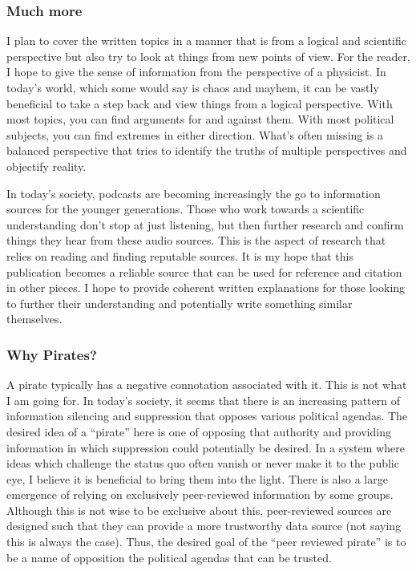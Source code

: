 \documentclass[10pt, a4paper, twocolumn]{book}
\begin{document}
\subsubsection*{Much more}

I plan to cover the written topics in a manner that is from a logical and scientific perspective but also try to look at things from new points of view. For the reader, I hope to give the sense of information from the perspective of a physicist. In today's world, which some would say is chaos and mayhem, it can be vastly beneficial to take a step back and view things from a logical perspective. With most topics, you can find arguments for and against them. With most political subjects, you can find extremes in either direction. What's often missing is a balanced perspective that tries to identify the truths of multiple perspectives and objectify reality. 

In today's society, podcasts are becoming increasingly the go to information sources for the younger generations. Those who work towards a scientific understanding don't stop at just listening, but then further research and confirm things they hear from these audio sources. This is the aspect of research that relies on reading and finding reputable sources. It is my hope that this publication becomes a reliable source that can be used for reference and citation in other pieces. I hope to provide coherent written explanations for those looking to further their understanding and potentially write something similar themselves.

\subsubsection{Why Pirates?}

A pirate typically has a negative connotation associated with it. This is not what I am going for. In today's society, it seems that there is an increasing pattern of information silencing and suppression that opposes various political agendas. The desired idea of a ``pirate'' here is one of opposing that authority and providing information in which suppression could potentially be desired. In a system where ideas which challenge the status quo often vanish or never make it to the public eye, I believe it is beneficial to bring them into the light. There is also a large emergence of relying on exclusively peer-reviewed information by some groups. Although this is not wise to be exclusive about this, peer-reviewed sources are designed such that they can provide a more trustworthy data source (not saying this is always the case). Thus, the desired goal of the ``peer reviewed pirate'' is to be a name of opposition the political agendas that can be trusted.
\end{document}
